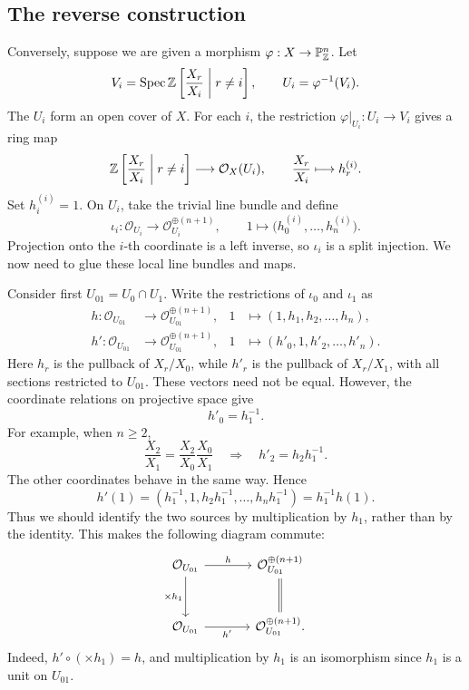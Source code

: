 
\subsection*{The reverse construction}

Conversely, suppose we are given a morphism
\(\varphi:X\to\mathbb{P}^n_{\mathbb{Z}}\). Let
\[
    V_i=\operatorname{Spec}\mathbb{Z}\left[
        \frac{X_r}{X_i}\;\middle|\;r\ne i
    \right],
    \qquad
    U_i=\varphi^{-1}(V_i).
\]
The \(U_i\) form an open cover of \(X\). For each \(i\), the
restriction \(\varphi|_{U_i}:U_i\to V_i\) gives a ring map
\[
    \mathbb{Z}\left[
        \frac{X_r}{X_i}\;\middle|\;r\ne i
    \right]
    \longrightarrow\mathcal O_X(U_i),
    \qquad
    \frac{X_r}{X_i}\longmapsto h_r^{(i)}.
\]
Set \(h_i^{(i)}=1\). On \(U_i\), take the trivial line bundle
and define
\[
    \iota_i:\mathcal O_{U_i}
    \longrightarrow\mathcal O_{U_i}^{\oplus(n+1)},
    \qquad
    1\longmapsto
    \bigl(h_0^{(i)},\ldots,h_n^{(i)}\bigr).
\]
Projection onto the \(i\)-th coordinate is a left inverse, so
\(\iota_i\) is a split injection. We now need to glue these
local line bundles and maps.

Consider first \(U_{01}=U_0\cap U_1\). Write the restrictions
of \(\iota_0\) and \(\iota_1\) as
\[
    \begin{aligned}
        h:\mathcal O_{U_{01}}
        &\longrightarrow\mathcal O_{U_{01}}^{\oplus(n+1)},
        &1&\longmapsto(1,h_1,h_2,\ldots,h_n),\\
        h':\mathcal O_{U_{01}}
        &\longrightarrow\mathcal O_{U_{01}}^{\oplus(n+1)},
        &1&\longmapsto(h'_0,1,h'_2,\ldots,h'_n).
    \end{aligned}
\]
Here \(h_r\) is the pullback of \(X_r/X_0\), while \(h'_r\)
is the pullback of \(X_r/X_1\), with all sections restricted
to \(U_{01}\). These vectors need not be equal. However,
the coordinate relations on projective space give
\[
    h'_0=h_1^{-1}.
\]
For example, when \(n\ge2\),
\[
    \frac{X_2}{X_1}
    =
    \frac{X_2}{X_0}\frac{X_0}{X_1}
    \quad\Longrightarrow\quad
    h'_2=h_2h_1^{-1}.
\]
The other coordinates behave in the same way. Hence
\[
    h'(1)
    =
    (h_1^{-1},1,h_2h_1^{-1},\ldots,h_nh_1^{-1})
    =
    h_1^{-1}h(1).
\]
Thus we should identify the two sources by multiplication
by \(h_1\), rather than by the identity. This makes the
following diagram commute:
\[
    \begin{tikzcd}[column sep=large,row sep=large]
        \mathcal O_{U_{01}}
        \arrow[r,"h"]
        \arrow[d,"\times h_1"']
        & \mathcal O_{U_{01}}^{\oplus(n+1)}
        \arrow[d,equal]\\
        \mathcal O_{U_{01}}
        \arrow[r,"h'"']
        & \mathcal O_{U_{01}}^{\oplus(n+1)}.
    \end{tikzcd}
\]
Indeed, \(h'\circ(\times h_1)=h\), and multiplication by
\(h_1\) is an isomorphism since \(h_1\) is a unit on
\(U_{01}\).

